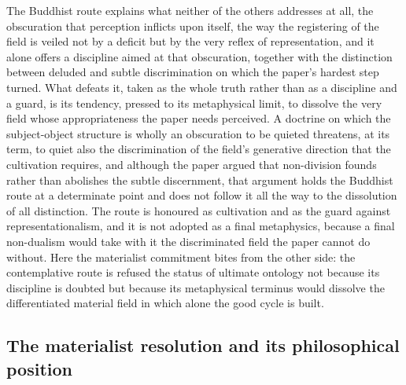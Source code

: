 The Buddhist route explains what neither of the others addresses at all, the obscuration that perception inflicts upon itself, the way the registering of the field is veiled not by a deficit but by the very reflex of representation, and it alone offers a discipline aimed at that obscuration, together with the distinction between deluded and subtle discrimination on which the paper's hardest step turned. What defeats it, taken as the whole truth rather than as a discipline and a guard, is its tendency, pressed to its metaphysical limit, to dissolve the very field whose appropriateness the paper needs perceived. A doctrine on which the subject-object structure is wholly an obscuration to be quieted threatens, at its term, to quiet also the discrimination of the field's generative direction that the cultivation requires, and although the paper argued that non-division founds rather than abolishes the subtle discernment, that argument holds the Buddhist route at a determinate point and does not follow it all the way to the dissolution of all distinction. The route is honoured as cultivation and as the guard against representationalism, and it is not adopted as a final metaphysics, because a final non-dualism would take with it the discriminated field the paper cannot do without. Here the materialist commitment bites from the other side: the contemplative route is refused the status of ultimate ontology not because its discipline is doubted but because its metaphysical terminus would dissolve the differentiated material field in which alone the good cycle is built.

\subsection{The materialist resolution and its philosophical position}
\label{p22:sub:perception-materialist}

